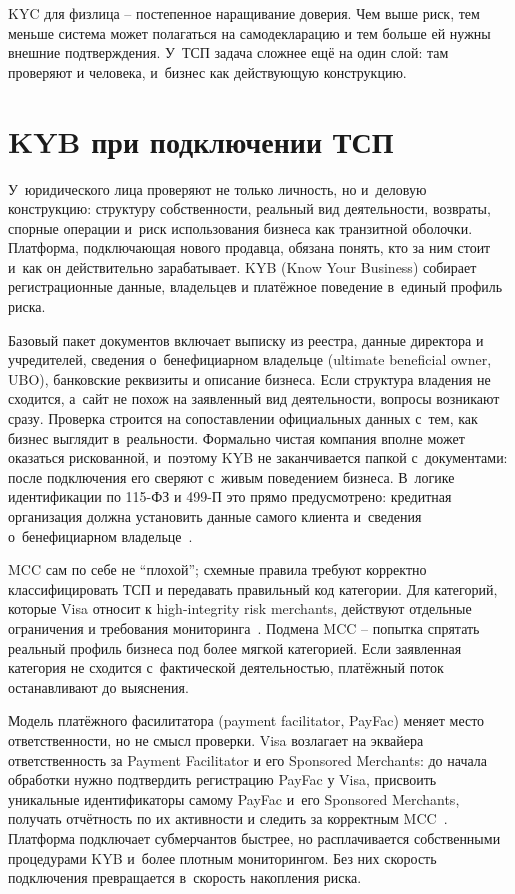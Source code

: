 KYC для физлица -- постепенное наращивание доверия. Чем выше риск,
тем меньше система может полагаться на самодекларацию и тем больше
ей нужны внешние подтверждения. У~ТСП задача сложнее ещё на один
слой: там проверяют и человека, и~бизнес как действующую конструкцию.

\section{KYB при подключении ТСП}\label{sec:compliance-kyb}

У~юридического лица проверяют не только личность, но и~деловую
конструкцию: структуру собственности, реальный вид деятельности,
возвраты, спорные операции и~риск использования бизнеса как
транзитной оболочки. Платформа, подключающая нового продавца,
обязана понять, кто за ним стоит и~как он действительно зарабатывает.
KYB (Know Your Business) собирает регистрационные данные, владельцев
и платёжное поведение в~единый профиль риска.

Базовый пакет документов включает выписку из реестра, данные
директора и учредителей, сведения о~бенефициарном владельце
(ultimate beneficial owner, UBO), банковские реквизиты и описание
бизнеса. Если структура владения не сходится, а~сайт не похож на
заявленный вид деятельности, вопросы возникают сразу. Проверка
строится на сопоставлении официальных данных с~тем, как бизнес
выглядит в~реальности. Формально чистая компания вполне может
оказаться рискованной, и~поэтому KYB не заканчивается папкой
с~документами: после подключения его сверяют с~живым поведением
бизнеса. В~логике идентификации по 115-ФЗ и \mbox{499-П} это прямо
предусмотрено: кредитная организация должна установить данные
самого клиента и~сведения о~бенефициарном владельце~\cite{cbr-499p}.

MCC сам по себе не \enquote{плохой}; схемные правила требуют
корректно классифицировать ТСП и передавать правильный код
категории. Для категорий, которые Visa относит к high-integrity risk
merchants, действуют отдельные ограничения и требования
мониторинга~\cite{visa-core-rules}. Подмена MCC -- попытка спрятать
реальный профиль бизнеса под более мягкой категорией. Если
заявленная категория не сходится с~фактической деятельностью,
платёжный поток останавливают до выяснения.

Модель платёжного фасилитатора (payment facilitator, PayFac)
меняет место ответственности, но не смысл проверки. Visa возлагает
на эквайера ответственность за Payment Facilitator и его Sponsored
Merchants: до начала обработки нужно подтвердить регистрацию PayFac
у Visa, присвоить уникальные идентификаторы самому PayFac и~его
Sponsored Merchants, получать отчётность по их активности и следить
за корректным MCC~\cite{visa-core-rules}. Платформа подключает
субмерчантов быстрее, но расплачивается собственными процедурами KYB
и~более плотным мониторингом. Без них скорость подключения
превращается в~скорость накопления риска.

